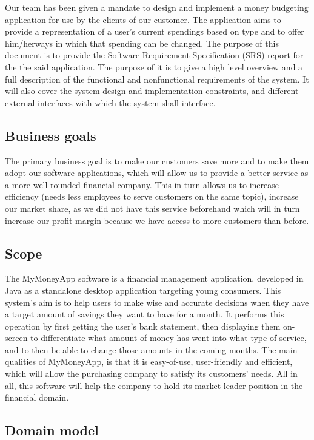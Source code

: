 \documentclass[letterpaper]{article}
\begin{document}
		Our team has been given a mandate to design and implement a money budgeting application for use by the clients of our customer. The application aims to provide a representation of a user's current spendings based on type and to offer him/herways in which that spending can be changed. The purpose of this document is to provide the Software Requirement Specification (SRS) report for the the said application. The purpose of it is to give a high level overview and a full description of the functional and nonfunctional requirements of the system. It will also cover the system design and implementation constraints, and different external interfaces with which the system shall interface.
	
	\subsection{Business goals}
	
		The primary business goal is to make our customers save more and to make them adopt our software applications, which will allow us to provide a better service as a more well rounded financial company. This in turn allows us to increase efficiency (needs less employees to serve customers on the same topic), increase our market share, as we did not have this service beforehand which will in turn increase our profit margin because we have access to more customers than before.
	
	\subsection{Scope}
	
		The MyMoneyApp software is a financial management application, developed in Java as a standalone desktop application targeting young consumers. This system’s aim is to help users to make wise and accurate decisions when they have a target amount of savings they want to have for a month. It performs this operation by first getting the user’s bank statement, then displaying them on-screen to differentiate what amount of money has went into what type of service, and to then be able to change those amounts in the coming months. The main qualities of MyMoneyApp, is that it is easy-of-use, user-friendly and efficient, which will allow the purchasing company to satisfy its customers’ needs. All in all, this software will help the company to hold its market leader position in the financial domain.
	
	\subsection{Domain model}
	
\end{document}
